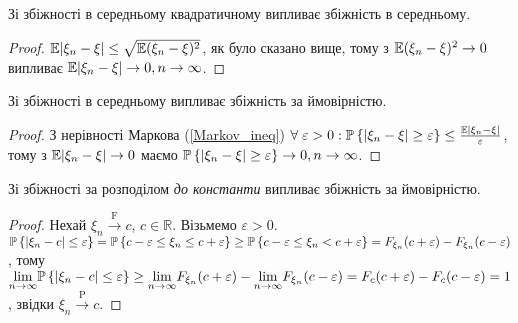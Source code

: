 \begin{proposition*} 
    Зі збіжності в середньому квадратичному випливає збіжність в середньому.
\end{proposition*}
\begin{proof}
    $\E|\xi_n -\xi| \leq \sqrt{\E(\xi_n - \xi)^2}$, як було сказано вище, тому з $\E(\xi_n - \xi)^2 \to 0$
    випливає $\E|\xi_n - \xi| \to 0, n\to\infty$.
\end{proof}
\begin{proposition*}
    Зі збіжності в середньому випливає збіжність за ймовірністю.
\end{proposition*}
\begin{proof}
    З нерівності Маркова (\ref{Markov_ineq})
    $\forall \; \varepsilon > 0: \P\left\{|\xi_n - \xi| \geq \varepsilon\right\} \leq \frac{\E|\xi_n - \xi|}{\varepsilon}$, 
    тому з $\E|\xi_n - \xi| \to 0$ маємо $\P\left\{|\xi_n - \xi| \geq \varepsilon\right\} \to 0, n\to\infty$.
\end{proof}
\begin{proposition*}
     Зі збіжності за розподілом \emph{до константи} випливає збіжність за ймовірністю.
\end{proposition*}
\begin{proof}
    Нехай $\xi_n \overset{\mathrm{F}}{\longrightarrow} c$, $c \in \mathbb{R}$. Візьмемо $\varepsilon > 0$.
    $\P\left\{ |\xi_n - c| \leq \varepsilon\right\} = \P\left\{ c - \varepsilon \leq \xi_n \leq c + \varepsilon \right\} \geq
    \P\left\{ c - \varepsilon \leq \xi_n < c + \varepsilon \right\} = F_{\xi_n}(c+\varepsilon) - F_{\xi_n}(c-\varepsilon)$, тому
    $\underset{n \to \infty}{\lim} \P\left\{ |\xi_n - c| \leq \varepsilon\right\} \geq \underset{n \to \infty}{\lim}  F_{\xi_n}(c+\varepsilon) -
    \underset{n \to \infty}{\lim}  F_{\xi_n}(c-\varepsilon) = F_c(c+\varepsilon) - F_c(c-\varepsilon) = 1$, звідки $\xi_n \overset{\mathrm{P}}{\longrightarrow} c$.
\end{proof}
